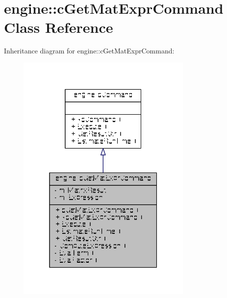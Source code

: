 \hypertarget{classengine_1_1cGetMatExprCommand}{\section{engine\-:\-:c\-Get\-Mat\-Expr\-Command Class Reference}
\label{classengine_1_1cGetMatExprCommand}
}


Inheritance diagram for engine\-:\-:c\-Get\-Mat\-Expr\-Command\-:
\nopagebreak
\begin{figure}[H]
\begin{center}
\leavevmode
\includegraphics[width=244pt]{classengine_1_1cGetMatExprCommand__inherit__graph}
\end{center}
\end{figure}


